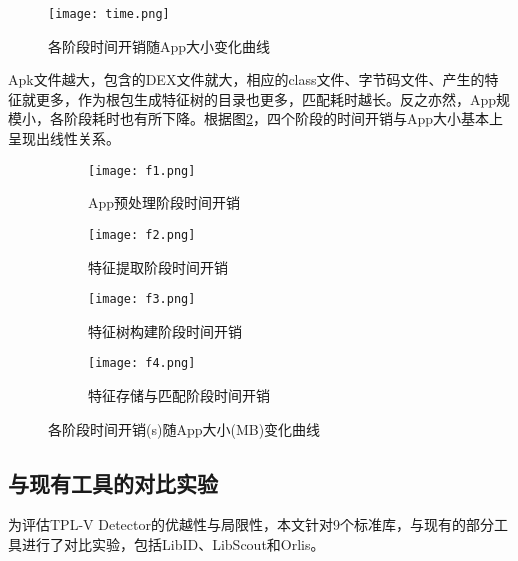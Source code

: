 \begin{figure}[!htp]
  \centering
  \texttt{[image: time.png]} \\
  \caption{各阶段时间开销随App大小变化曲线}
 \label{fig:flow}
\end{figure}


Apk文件越大，包含的DEX文件就大，相应的class文件、字节码文件、产生的特征就更多，作为根包生成特征树的目录也更多，匹配耗时越长。反之亦然，App规模小，各阶段耗时也有所下降。根据图\ref{fig:four}，四个阶段的时间开销与App大小基本上呈现出线性关系。

\begin{figure}[!htp]
  \centering
  \begin{subfigure}{0.4\textwidth}
    \centering
    \texttt{[image: f1.png]}
    \caption{App预处理阶段时间开销}
  \end{subfigure}
  \hspace{1cm}
  \begin{subfigure}{0.4\textwidth}
    \centering
    \texttt{[image: f2.png]}
    \caption{特征提取阶段时间开销}
  \end{subfigure}
  \vfill
  \begin{subfigure}{0.4\textwidth}
    \centering
    \texttt{[image: f3.png]}
    \caption{特征树构建阶段时间开销}
  \end{subfigure}
  \hspace{1cm}
  \begin{subfigure}{0.4\textwidth}
    \centering
    \texttt{[image: f4.png]}
    \caption{特征存储与匹配阶段时间开销}
  \end{subfigure}
  \caption{各阶段时间开销(s)随App大小(MB)变化曲线}
  \label{fig:four}
\end{figure}


\subsection{与现有工具的对比实验}

为评估TPL-V Detector的优越性与局限性，本文针对9个标准库，与现有的部分工具进行了对比实验，包括LibID\cite{zhang2019libid}、LibScout\cite{backes2016reliable}和Orlis\cite{wang2018orlis}。

